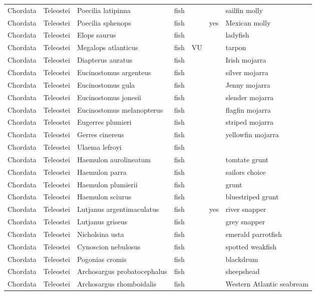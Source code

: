 \begin{longtable}{lllllll}
  Chordata & Teleostei & Poecilia latipinna & fish &  &  & sailfin molly \\ 
  Chordata & Teleostei & Poecilia sphenops & fish &  & yes & Mexican molly \\ 
  Chordata & Teleostei & Elops saurus & fish &  &  & ladyfish \\ 
  Chordata & Teleostei & Megalops atlanticus & fish & VU &  & tarpon \\ 
  Chordata & Teleostei & Diapterus auratus & fish &  &  & Irish mojarra \\ 
  Chordata & Teleostei & Eucinostomus argenteus & fish &  &  & silver mojarra \\ 
  Chordata & Teleostei & Eucinostomus gula & fish &  &  & Jenny mojarra \\ 
  Chordata & Teleostei & Eucinostomus jonesii & fish &  &  & slender mojarra \\ 
  Chordata & Teleostei & Eucinostomus melanopterus & fish &  &  & flagfin mojarra \\ 
  Chordata & Teleostei & Eugerres plumieri & fish &  &  & striped mojarra \\ 
  Chordata & Teleostei & Gerres cinereus & fish &  &  & yellowfin mojarra \\ 
  Chordata & Teleostei & Ulaema lefroyi & fish &  &  &  \\ 
  Chordata & Teleostei & Haemulon aurolineatum & fish &  &  & tomtate grunt \\ 
  Chordata & Teleostei & Haemulon parra & fish &  &  & sailors choice \\ 
  Chordata & Teleostei & Haemulon plumierii & fish &  &  & grunt \\ 
  Chordata & Teleostei & Haemulon sciurus & fish &  &  & bluestriped grunt \\ 
  Chordata & Teleostei & Lutjanus argentimaculatus & fish &  & yes & river snapper \\ 
  Chordata & Teleostei & Lutjanus griseus & fish &  &  & grey snapper \\ 
  Chordata & Teleostei & Nicholsina usta & fish &  &  & emerald parrotfish \\ 
  Chordata & Teleostei & Cynoscion nebulosus & fish &  &  & spotted weakfish \\ 
  Chordata & Teleostei & Pogonias cromis & fish &  &  & blackdrum \\ 
  Chordata & Teleostei & Archosargus probatocephalus & fish &  &  & sheepshead \\ 
  Chordata & Teleostei & Archosargus rhomboidalis & fish &  &  & Western Atlantic seabream \\ 

\end{longtable}
